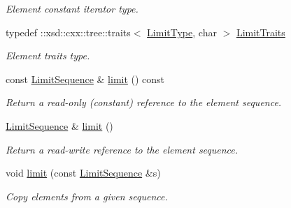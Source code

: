 \begin{DoxyCompactItemize}
\begin{DoxyCompactList}\small\item\em Element constant iterator type. \item\end{DoxyCompactList}\item 
\hypertarget{classopenstack_1_1xml_1_1RateLimits_a8e58e7dcae426cf21999f998a4418e55}{
typedef ::xsd::cxx::tree::traits$<$ \hyperlink{classopenstack_1_1xml_1_1RateLimit}{LimitType}, char $>$ \hyperlink{classopenstack_1_1xml_1_1RateLimits_a8e58e7dcae426cf21999f998a4418e55}{LimitTraits}}
\label{classopenstack_1_1xml_1_1RateLimits_a8e58e7dcae426cf21999f998a4418e55}

\begin{DoxyCompactList}\small\item\em Element traits type. \item\end{DoxyCompactList}\item 
const \hyperlink{classopenstack_1_1xml_1_1RateLimits_a51412c2aa554f271b6bca7986198bcb9}{LimitSequence} \& \hyperlink{classopenstack_1_1xml_1_1RateLimits_a9392f0bb147ffbd7ce645f0314822194}{limit} () const 
\begin{DoxyCompactList}\small\item\em Return a read-\/only (constant) reference to the element sequence. \item\end{DoxyCompactList}\item 
\hyperlink{classopenstack_1_1xml_1_1RateLimits_a51412c2aa554f271b6bca7986198bcb9}{LimitSequence} \& \hyperlink{classopenstack_1_1xml_1_1RateLimits_a61563b90eefaaae23cf0ebc799f33fd2}{limit} ()
\begin{DoxyCompactList}\small\item\em Return a read-\/write reference to the element sequence. \item\end{DoxyCompactList}\item 
void \hyperlink{classopenstack_1_1xml_1_1RateLimits_a04696ddfa0a4b7798f6f4d867042106a}{limit} (const \hyperlink{classopenstack_1_1xml_1_1RateLimits_a51412c2aa554f271b6bca7986198bcb9}{LimitSequence} \&s)
\begin{DoxyCompactList}\small\item\em Copy elements from a given sequence. \item\end{DoxyCompactList}\end{DoxyCompactItemize}
